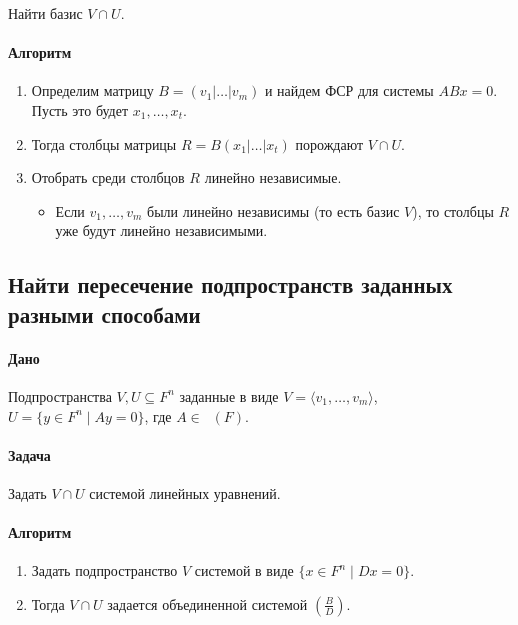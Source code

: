 \documentclass{article}
\newcommand{\MatrixDim}[3]{\mathop{\mathrm{M}_{#2\,#3}}(#1)}
\begin{document}
Найти базис $V \cap U$.

\paragraph{Алгоритм}
\begin{enumerate}
\item Определим матрицу $B = (v_1|\ldots|v_m)$ и найдем ФСР для системы $AB x = 0$. Пусть это будет $x_1,\ldots, x_t$.

\item Тогда столбцы матрицы $R = B (x_1|\ldots|x_t)$ порождают $V \cap U$.

\item Отобрать среди столбцов $R$ линейно независимые.
\begin{itemize}
\item Если $v_1,\ldots,v_m$ были линейно независимы (то есть базис $V$), то столбцы $R$ уже будут линейно независимыми.
\end{itemize}
\end{enumerate}

\subsection{Найти пересечение подпространств заданных разными способами}

\paragraph{Дано}

Подпространства $V,U\subseteq F^{n}$ заданные в виде $V =\langle v_1,\ldots,v_m\rangle$, $U = \{y\in F^{n}\mid Ay = 0\}$, где $A\in \MatrixDim{F}{k}{n}$.

\paragraph{Задача}

Задать $V \cap U$ системой линейных уравнений.

\paragraph{Алгоритм}
\begin{enumerate}
\item Задать подпространство $V$ системой в виде $\{x\in F^n \mid Dx = 0\}$.

\item Тогда $V\cap U$ задается объединенной системой $\left(\frac{B}{D}\right)$.
\end{enumerate}
\end{document}
